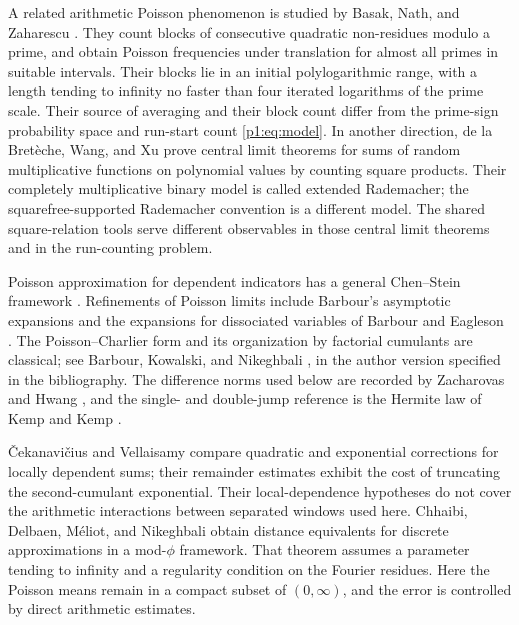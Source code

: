 A related arithmetic Poisson phenomenon is studied by Basak,
Nath, and Zaharescu \cite[Theorem~1]{basaknathzaharescu2024}.
They count blocks of consecutive quadratic non-residues modulo
a prime, and obtain Poisson frequencies under translation for
almost all primes in suitable intervals. Their blocks lie in
an initial polylogarithmic range, with a length tending to
infinity no faster than four iterated logarithms of the prime
scale. Their source of averaging and their block count differ
from the prime-sign probability space and run-start count
\eqref{p1:eq:model}. In another direction, de la Bret\`eche,
Wang, and Xu \cite{bretwngxu2026} prove central limit theorems
for sums of random multiplicative functions on polynomial
values by counting square products. Their completely
multiplicative binary model is called extended Rademacher;
the squarefree-supported Rademacher convention is a different
model. The shared square-relation tools serve different
observables in those central limit theorems and in the
run-counting problem.

Poisson approximation for dependent indicators has a general
Chen--Stein framework \cite{agg1989}. Refinements of Poisson
limits include Barbour's asymptotic expansions
\cite{barbour1987} and the expansions for dissociated variables
of Barbour and Eagleson \cite{barboureagleson1987}.
The Poisson--Charlier form and its organization by factorial
cumulants are classical; see Barbour, Kowalski, and Nikeghbali
\cite[Sections~5 and~8.1]{bkn2014}, in the author version
specified in the bibliography. The difference norms used below
are recorded by Zacharovas and Hwang
\cite[equation~(2.13) and Remark~4.4]{zacharovashwang2010},
and the single- and double-jump reference is the Hermite law
of Kemp and Kemp \cite{kempkemp1965}.

\v{C}ekanavi\v{c}ius and Vellaisamy
\cite[Theorems~3.1--3.2]{cekanaviciusvellaisamy2015} compare
quadratic and exponential corrections for locally dependent sums;
their remainder estimates exhibit the cost of truncating the
second-cumulant exponential. Their local-dependence hypotheses
do not cover the arithmetic interactions between separated windows
used here. Chhaibi, Delbaen, M\'eliot, and Nikeghbali
\cite[Theorem~3.11]{chhaibietal2020} obtain distance equivalents
for discrete approximations in a mod-\(\phi\) framework. That
theorem assumes a parameter tending to infinity and a regularity
condition on the Fourier residues. Here the Poisson means remain in a compact
subset of \((0,\infty)\), and the error is controlled by direct
arithmetic estimates.

